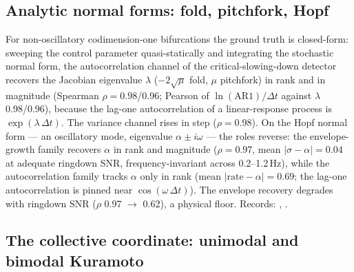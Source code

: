 \documentclass[11pt]{article}
\begin{document}
\subsection{Analytic normal forms: fold, pitchfork, Hopf}\label{sec:normalforms}

For non-oscillatory codimension-one bifurcations the ground truth is
closed-form: sweeping the control parameter quasi-statically and
integrating the stochastic normal form, the autocorrelation channel of
the critical-slowing-down detector recovers the Jacobian eigenvalue
$\lambda$ ($-2\sqrt{\mu}$ fold, $\mu$ pitchfork) in rank and in
magnitude (Spearman $\rho = 0.98$/0.96; Pearson of
$\ln(\mathrm{AR1})/\Delta t$ against $\lambda$ 0.98/0.96), because the
lag-one autocorrelation of a linear-response process is
$\exp(\lambda\,\Delta t)$. The variance channel rises in step
($\rho = 0.98$). On the Hopf normal form --- an oscillatory mode,
eigenvalue $\alpha \pm i\omega$ --- the roles reverse: the
envelope-growth family recovers $\alpha$ in rank and magnitude
($\rho = 0.97$, mean $|\sigma - \alpha| = 0.04$ at adequate ringdown
SNR, frequency-invariant across 0.2--1.2\,Hz), while the
autocorrelation family tracks $\alpha$ only in rank (mean
$|\mathrm{rate} - \alpha| = 0.69$; the lag-one autocorrelation is
pinned near $\cos(\omega\,\Delta t)$). The envelope recovery degrades
with ringdown SNR ($\rho$ 0.97 $\to$ 0.62), a physical floor. Records:
,
.

\subsection{The collective coordinate: unimodal and bimodal Kuramoto}\label{sec:kuramoto}
\end{document}
